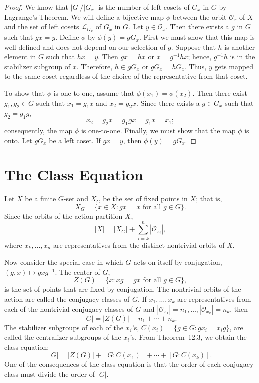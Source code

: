  
\begin{proof}
We know that  $|G|/|G_x|$ is the number of left cosets of $G_x$ in $G$
by Lagrange's Theorem. We will define a bijective  map $\phi$
between the orbit ${\mathcal O}_x$ of $X$ and the set of left cosets 
${\mathcal L}_{G_x}$ of $G_x$ in $G$. Let $y \in {\mathcal O}_x$. Then there 
exists a $g$ in $G$ such that $g x = y$. Define $\phi$ by $\phi( y ) 
= g G_x$. First we must show that this map is well-defined and does 
not depend on our selection of $g$. Suppose that $h$ is another 
element in $G$ such that $hx = y$. Then $g x = h x$ or $x= g^{-1} h x$; 
hence, $g^{-1}h$ is in the stabilizer subgroup of $x$. Therefore, 
$h \in g G_x$ or $g G_x = h G_x$.  Thus, $y$ gets mapped to the same 
coset regardless of the choice of the representative from that coset.
 
 
To show that $\phi$ is one-to-one, assume that $\phi(x_1) =
\phi(x_2)$. Then there exist $g_1, g_2 \in G$ such that $x_1 = g_1 x$
and $x_2 = g_2 x$. Since there exists a $g \in G_x$ such that $g_2=g_1
g$, 
\[
x_2 = g_2 x = g_1 g x = g_1 x = x_1;
\]
consequently, the map $\phi$ is  one-to-one. Finally, we must show
that the map $\phi$ is onto. Let $g G_x$ be a left coset. If $g x =
y$, then $\phi(y) = g G_x$. 
\end{proof}
 
 
 
 
\section{The Class Equation}
 
 
 
Let $X$ be a finite $G$-set and $X_G$\label{noteXG} be the set of fixed 
points in $X$; that is, 
\[
X_G = \{ x \in X : gx = x \mbox{ for all $g \in G$} \}.
\]
Since the orbits of the action partition $X$,
\[
|X| = |X_G| + \sum_{i = k}^n |{\mathcal O}_{x_i}|,
\]
where $x_k, \ldots, x_n$ are representatives from the distinct
nontrivial orbits of $X$. 
 
 
Now consider the special case in which $G$ acts on itself by conjugation,
$(g,x) \mapsto gxg^{-1}$. The {\bfi center\/} of
$G$, 
\[
Z(G) = \{x : xg = gx \mbox{ for all $g \in G$} \},
\]
is the set of points that are fixed by conjugation. The nontrivial
orbits of the action are called the {\bfi conjugacy
classes\/} of $G$. If $x_1, \ldots, x_k$ are
representatives from each of the nontrivial conjugacy classes of $G$
and $|{\mathcal O}_{x_1}| = n_1, \ldots, |{\mathcal O}_{x_k}| = n_k$, then 
\[
|G| = |Z(G)| + n_1 + \cdots + n_k.
\]
The stabilizer subgroups of each of the $x_i$'s, $C(x_i) = \{ g \in G
: g x_i = x_i g \}$, are called the {\bfi centralizer
subgroups\/} of the $x_i$'s. From Theorem~12.3, we obtain the {\bfi class
equation\/}: 
\[
|G| = |Z(G)| + [G: C(x_1) ] + \cdots + [ G: C(x_k)].
\]
One of the consequences of the class equation is that the order of
each conjugacy class must divide the order of $|G|$.
 
